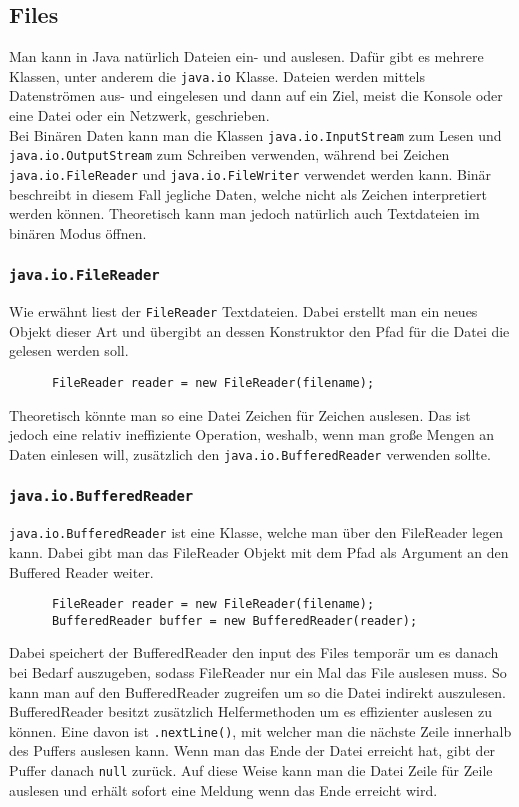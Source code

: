\documentclass{article}
\begin{document}
	 \subsection{Files}
	 Man kann in Java natürlich Dateien ein- und auslesen. Dafür gibt es mehrere Klassen, unter anderem die \verb|java.io| Klasse. Dateien werden mittels Datenströmen aus- und eingelesen und dann auf ein Ziel, meist die Konsole oder eine Datei oder ein Netzwerk, geschrieben. \\
	 Bei Binären Daten kann man die Klassen \verb|java.io.InputStream| zum Lesen und \verb|java.io.OutputStream| zum Schreiben verwenden, während bei Zeichen \verb|java.io.FileReader| und \verb|java.io.FileWriter| verwendet werden kann. Binär beschreibt in diesem Fall jegliche Daten, welche nicht als Zeichen interpretiert werden können. Theoretisch kann man jedoch natürlich auch Textdateien im binären Modus öffnen.
	 \cprotect\subsubsection{\texorpdfstring{\verb|java.io.FileReader|}{}}
	 Wie erwähnt liest der \verb|FileReader| Textdateien. Dabei erstellt man ein neues Objekt dieser Art und übergibt an dessen Konstruktor den Pfad für die Datei die gelesen werden soll.
	 \begin{verbatim}
	  FileReader reader = new FileReader(filename);
	 \end{verbatim} 
	 Theoretisch könnte man so eine Datei Zeichen für Zeichen auslesen. Das ist jedoch eine relativ ineffiziente Operation, weshalb, wenn man große Mengen an Daten einlesen will, zusätzlich den \verb|java.io.BufferedReader| verwenden sollte. 
	 \cprotect\subsubsection{\texorpdfstring{\verb|java.io.BufferedReader|}{}}
	 \verb|java.io.BufferedReader| ist eine Klasse, welche man über den FileReader legen kann. Dabei gibt man das FileReader Objekt mit dem Pfad als Argument an den Buffered Reader weiter.
	 \begin{verbatim}
	  FileReader reader = new FileReader(filename);
	  BufferedReader buffer = new BufferedReader(reader);
	  \end{verbatim} 
	  Dabei speichert der BufferedReader den input des Files temporär um es danach bei Bedarf auszugeben, sodass FileReader nur ein Mal das File auslesen muss. So kann man auf den BufferedReader zugreifen um so die Datei indirekt auszulesen. BufferedReader besitzt zusätzlich Helfermethoden um es effizienter auslesen zu können. Eine davon ist \verb|.nextLine()|, mit welcher man die nächste Zeile innerhalb des Puffers auslesen kann. Wenn man das Ende der Datei erreicht hat, gibt der Puffer danach \verb|null| zurück. Auf diese Weise kann man die Datei Zeile für Zeile auslesen und erhält sofort eine Meldung wenn das Ende erreicht wird.
\end{document}

